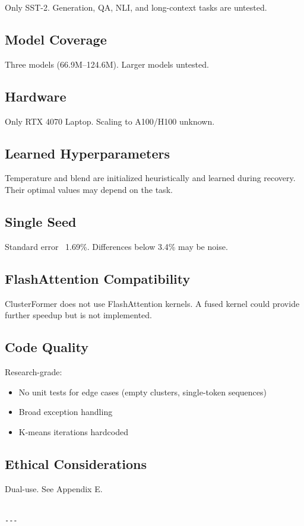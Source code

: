 Only SST-2. Generation, QA, NLI, and long-context tasks are untested.

\subsection{Model Coverage}

Three models (66.9M--124.6M). Larger models untested.

\subsection{Hardware}

Only RTX 4070 Laptop. Scaling to A100/H100 unknown.

\subsection{Learned Hyperparameters}

Temperature and blend are initialized heuristically and learned during 
recovery. Their optimal values may depend on the task.

\subsection{Single Seed}

Standard error ~1.69\%. Differences below 3.4\% may be noise.

\subsection{FlashAttention Compatibility}

ClusterFormer does not use FlashAttention kernels. A fused kernel could 
provide further speedup but is not implemented.

\subsection{Code Quality}

Research-grade:
\begin{itemize}
\item No unit tests for edge cases (empty clusters, single-token sequences)
\item Broad exception handling
\item K-means iterations hardcoded

\end{itemize}
\subsection{Ethical Considerations}

Dual-use. See Appendix E.
\begin{lstlisting}

---
\end{lstlisting}